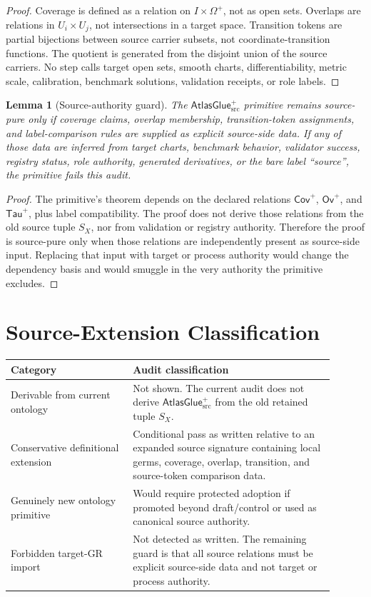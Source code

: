 \documentclass[11pt]{article}
\newcommand{\SX}{S_X}
\newcommand{\AtlasGlue}{\mathsf{AtlasGlue}_{\mathrm{src}}^{+}}
\newcommand{\Cov}{\mathsf{Cov}^{+}}
\newcommand{\Ov}{\mathsf{Ov}^{+}}
\newcommand{\Tau}{\mathsf{Tau}^{+}}
\newtheorem{lemma}{Lemma}
\begin{document}
\begin{proof}
Coverage is defined as a relation on \(I\times\Omega^+\), not as open sets.
Overlaps are relations in \(U_i\times U_j\), not intersections in a target
space. Transition tokens are partial bijections between source carrier
subsets, not coordinate-transition functions. The quotient is generated from
the disjoint union of the source carriers. No step calls target open sets,
smooth charts, differentiability, metric scale, calibration, benchmark
solutions, validation receipts, or role labels.
\end{proof}

\begin{lemma}[Source-authority guard]
The \(\AtlasGlue\) primitive remains source-pure only if coverage claims,
overlap membership, transition-token assignments, and label-comparison rules
are supplied as explicit source-side data. If any of those data are inferred
from target charts, benchmark behavior, validator success, registry status,
role authority, generated derivatives, or the bare label ``source'', the
primitive fails this audit.
\end{lemma}

\begin{proof}
The primitive's theorem depends on the declared relations \(\Cov\), \(\Ov\),
and \(\Tau\), plus label compatibility. The proof does not derive those
relations from the old source tuple \(\SX\), nor from validation or registry
authority. Therefore the proof is source-pure only when those relations are
independently present as source-side input. Replacing that input with target
or process authority would change the dependency basis and would smuggle in
the very authority the primitive excludes.
\end{proof}

\section{Source-Extension Classification}

\begin{center}
\begin{tabular}{p{0.34\linewidth}p{0.56\linewidth}}
\hline
Category & Audit classification \\
\hline
Derivable from current ontology & Not shown. The current audit does not
derive \(\AtlasGlue\) from the old retained tuple \(\SX\). \\
Conservative definitional extension & Conditional pass as written relative to
an expanded source signature containing local germs, coverage, overlap,
transition, and source-token comparison data. \\
Genuinely new ontology primitive & Would require protected adoption if
promoted beyond draft/control or used as canonical source authority. \\
Forbidden target-GR import & Not detected as written. The remaining guard is
that all source relations must be explicit source-side data and not target or
process authority. \\
\hline
\end{tabular}
\end{center}
\end{document}
